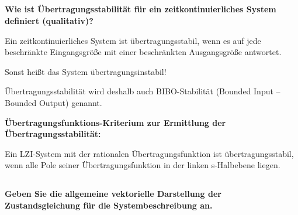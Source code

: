 \subsection{}
\textbf{Wie ist Übertragungsstabilität für ein zeitkontinuierliches System definiert (qualitativ)?}

Ein zeitkontinuierliches System ist übertragungsstabil, wenn es auf jede beschränkte Eingangsgröße mit einer beschränkten Ausgangsgröße antwortet.

Sonst heißt das System übertragungsinstabil!

Übertragungsstabilität wird deshalb auch BIBO-Stabilität (Bounded Input – Bounded Output) genannt.

\textbf{Übertragungsfunktions-Kriterium zur Ermittlung der Übertragungsstabilität:}

Ein LZI-System mit der rationalen Übertragungsfunktion ist übertragungsstabil, wenn alle Pole seiner Übertragungsfunktion in der linken s-Halbebene liegen.
\subsection{}
\textbf{Geben Sie die allgemeine vektorielle Darstellung der Zustandsgleichung für die Systembeschreibung an.}

